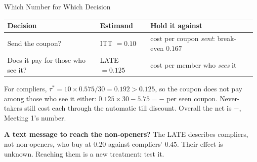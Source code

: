 \documentclass[aspectratio=169, 11pt, handout]{beamer}
\begin{document}
\begin{frame}{Which Number for Which Decision}

\begin{center}
\small
\begin{tabular}{lll}
\toprule
\textbf{Decision} & \textbf{Estimand} & \textbf{Hold it against} \\
\midrule
Send the coupon? & ITT $= 0.10$ & cost per coupon \emph{sent}: break-even $0.167$ \\
Does it pay for those who see it? & LATE $= 0.125$ & cost per member who \emph{sees} it \\
\bottomrule
\end{tabular}
\end{center}

\medskip

For compliers, $\tau^\ast = 10 \times 0.575/30 = 0.192 > 0.125$, so the coupon does not pay among those who see it either: $0.125 \times 30 - 5.75 = -$ per seen coupon. Never-takers still cost  each through the automatic till discount. Overall the net is $-$, Meeting 1's number.

\bigskip

\textbf{A text message to reach the non-openers?} The LATE describes compliers, not non-openers, who buy at $0.20$ against compliers' $0.45$. Their effect is unknown. Reaching them is a new treatment: test it.
\end{frame}
\end{document}
